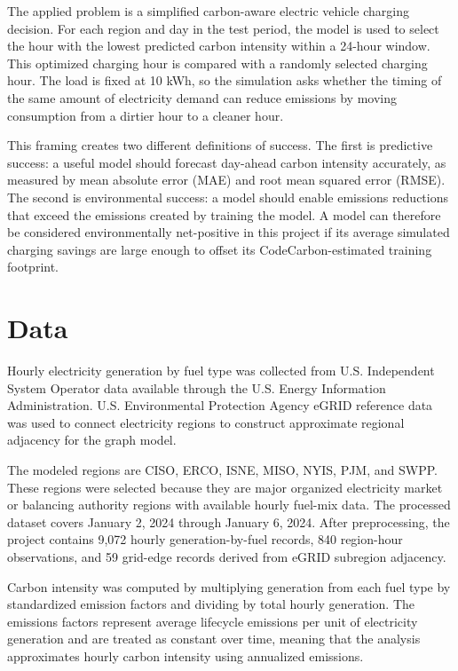 \documentclass{article}
\begin{document}
The applied problem is a simplified carbon-aware electric vehicle charging decision. For each region and day in the test period, the model is used to select the hour with the lowest predicted carbon intensity within a 24-hour window. This optimized charging hour is compared with a randomly selected charging hour. The load is fixed at 10 kWh, so the simulation asks whether the timing of the same amount of electricity demand can reduce emissions by moving consumption from a dirtier hour to a cleaner hour.

This framing creates two different definitions of success. The first is predictive success: a useful model should forecast day-ahead carbon intensity accurately, as measured by mean absolute error (MAE) and root mean squared error (RMSE). The second is environmental success: a model should enable emissions reductions that exceed the emissions created by training the model. A model can therefore be considered environmentally net-positive in this project if its average simulated charging savings are large enough to offset its CodeCarbon-estimated training footprint.

\section{Data}

Hourly electricity generation by fuel type was collected from U.S. Independent System Operator data available through the U.S. Energy Information Administration. U.S. Environmental Protection Agency eGRID reference data was used to connect electricity regions to construct approximate regional adjacency for the graph model.

The modeled regions are CISO, ERCO, ISNE, MISO, NYIS, PJM, and SWPP. These regions were selected because they are major organized electricity market or balancing authority regions with available hourly fuel-mix data. The processed dataset covers January 2, 2024 through January 6, 2024. After preprocessing, the project contains 9,072 hourly generation-by-fuel records, 840 region-hour observations, and 59 grid-edge records derived from eGRID subregion adjacency.

Carbon intensity was computed by multiplying generation from each fuel type by standardized emission factors and dividing by total hourly generation. The emissions factors represent average lifecycle emissions per unit of electricity generation and are treated as constant over time, meaning that the analysis approximates hourly carbon intensity using annualized emissions.
\end{document}

